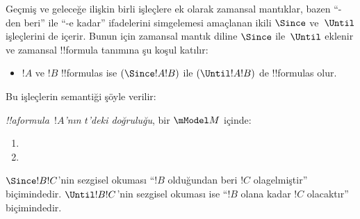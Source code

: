 \documentclass[../../../include/open-logic-section]{subfiles}
\begin{document}


Geçmiş ve geleceğe ilişkin birli işleçlere ek olarak zamansal mantıklar,
bazen ``-den beri'' ile ``-e kadar'' ifadelerini simgelemesi amaçlanan ikili
$\Since$ ve~$\Until$ işleçlerini de içerir. Bunun için zamansal mantık
diline $\Since$ ile~$\Until$ eklenir ve zamansal !!{formula} tanımına şu
koşul katılır:

\begin{itemize}
\item[] $!A$ ve $!B$ !!{formula}s ise $(\Since !A !B)$ ile
  $(\Until !A !B)$ de !!{formula}s olur.
\end{itemize}

Bu işleçlerin semantiği şöyle verilir:

\begin{defn}
  \emph{!!a{formula}~$!A$'nın $t$'deki doğruluğu}, bir $\mModel M$ içinde:
  \begin{enumerate}
  \item{} 
  \item{} 
  \end{enumerate} 
\end{defn}

$\Since !B !C$'nin sezgisel okuması ``$!B$ olduğundan beri $!C$
olagelmiştir'' biçimindedir. $\Until !B !C$'nin sezgisel okuması ise
``$!B$ olana kadar $!C$ olacaktır'' biçimindedir.
\end{document}
